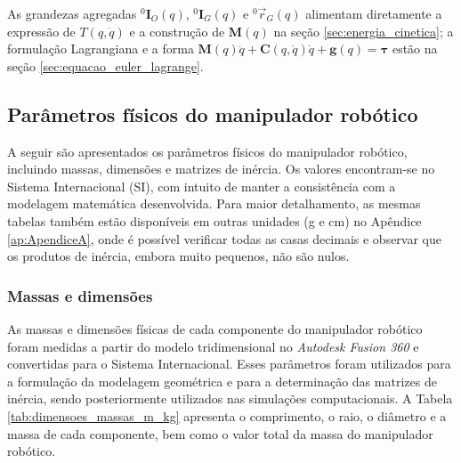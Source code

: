 As grandezas agregadas
\({}^{0}\!\mathbf I_{O}(q)\),
\({}^{0}\!\mathbf I_{G}(q)\) e
\({}^{0}\!\vec r_{G}(q)\)
alimentam diretamente a expressão de \(T(q,\dot q)\)
e a construção de \(\mathbf M(q)\) na seção \eqref{sec:energia_cinetica};
a formulação Lagrangiana e a forma \(\mathbf M(q)\ddot q+\mathbf C(q,\dot q)\dot q+\mathbf g(q)=\boldsymbol\tau\) estão na seção \eqref{sec:equacao_euler_lagrange}. 

\subsection{Parâmetros físicos do manipulador robótico}
A seguir são apresentados os parâmetros físicos do manipulador robótico, incluindo massas, dimensões e matrizes de inércia. 
Os valores encontram-se no Sistema Internacional (SI), com intuito de manter a consistência com a modelagem matemática desenvolvida. 
Para maior detalhamento, as mesmas tabelas também estão disponíveis em outras unidades (g e cm) no Apêndice
\eqref{ap:ApendiceA},
onde é possível verificar todas as casas decimais e observar que os produtos de inércia, embora muito pequenos, não são nulos.

\subsubsection{Massas e dimensões}
As massas e dimensões físicas de cada componente do manipulador robótico foram medidas a partir do modelo tridimensional no \emph{Autodesk Fusion 360} e convertidas para o Sistema Internacional. 
Esses parâmetros foram utilizados para a formulação da modelagem geométrica e para a determinação das matrizes de inércia, sendo posteriormente utilizados nas simulações computacionais. 
A Tabela \eqref{tab:dimensoes_massas_m_kg} apresenta o comprimento, o raio, o diâmetro e a massa de cada componente, bem como o valor total da massa do manipulador robótico.

